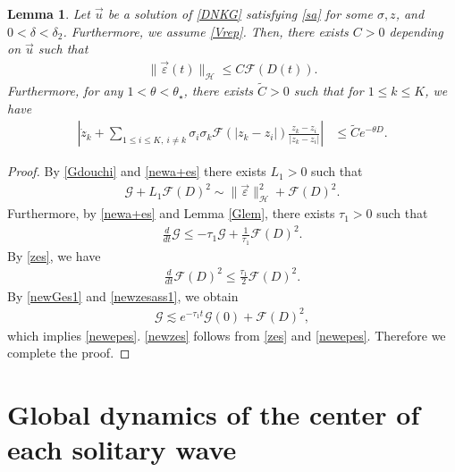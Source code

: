 \documentclass[reqno]{amsart}
\theoremstyle{plain}
\newtheorem{lemma}[theorem]{Lemma}
\theoremstyle{definition}
\numberwithin{equation}{section}
\newcommand{\1}{\mathbbm{1}}
\begin{document}
\begin{lemma}\label{epzes}
Let $\vec{u}$ be a solution of \eqref{DNKG} satisfying \eqref{sa} for some $\sigma, z$, and $0<\delta<\delta_2$. Furthermore, we assume \eqref{Vrep}. Then, there exists $C>0$ depending on $\vec{u}$ such that 
\begin{align}\label{newepes}
\|\vec{\varepsilon}(t)\|_{\mathcal{H}}\leq C \mathcal{F}(D(t)).
\end{align}
Furthermore, for any $1<\theta<\theta_{\star}$, there exists $\tilde{C}>0$ such that for $1\leq k\leq K$, we have
\begin{align}\label{newzes}
\left|\dot{z}_k+\sum_{1\leq i\leq K,\ i\neq k}\sigma_i\sigma_k\mathcal{F}(|z_k-z_i|)\frac{z_k-z_i}{|z_k-z_i|}\right|&\leq \tilde{C} e^{-\theta D}.
\end{align}
\end{lemma}
\begin{proof}
By \eqref{Gdouchi} and \eqref{newa+es} there exists $L_1>0$ such that 
\begin{align*}
\mathcal{G}+L_1\mathcal{F}(D)^2\sim \|\vec{\varepsilon}\|_{\mathcal{H}}^2+\mathcal{F}(D)^2.
\end{align*}
Furthermore, by \eqref{newa+es} and Lemma \ref{Glem}, there exists $\tau_1>0$ such that 
\begin{align}\label{newGes1}
\frac{d}{dt}\mathcal{G}\leq -\tau_1 \mathcal{G}+\frac{1}{\tau_1} \mathcal{F}(D)^2.
\end{align}
By \eqref{zes}, we have
\begin{align}\label{newzesass1}
\frac{d}{dt}\mathcal{F}(D)^2\leq \frac{\tau_1}{2}\mathcal{F}(D)^2.
\end{align}
By \eqref{newGes1} and \eqref{newzesass1}, we obtain
\begin{align*}
\mathcal{G}\lesssim e^{-\tau_1t}\mathcal{G}(0)+\mathcal{F}(D)^2,
\end{align*}
which implies \eqref{newepes}. \eqref{newzes} follows from \eqref{zes} and \eqref{newepes}. Therefore we complete the proof.
\end{proof}




\section{Global dynamics of the center of each solitary wave}
\end{document}
